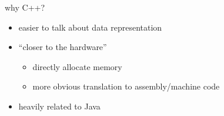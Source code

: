 \begin{frame}{why C++?}
    \begin{itemize}
    \item easier to talk about data representation
    \item ``closer to the hardware''
        \begin{itemize}
        \item directly allocate memory
        \item more obvious translation to assembly/machine code
        \end{itemize}
    \item heavily related to Java
    \end{itemize}
\end{frame}

\begin{comment}
\begin{frame}[fragile,label=cppHist]{C++ history}
\begin{tikzpicture}
\tikzset{
    histBox/.style={draw,thick,align=center,font=\fontsize{9}{10}\selectfont},
    a/.style={-Latex,thick},
    aa/.style={Latex-Latex,thick},
    b/.style={-Latex,thick,dotted},
    bb/.style={Latex-Latex,thick,dotted},
}
    \node [histBox] (bcpl) {BCPL\\(1967)};
    \node [histBox,below=.5cm of bcpl] (preC) {``K\&R'' C \\(1972-) \\ \scriptsize Dennis Ritchie, Bell Labs};
    \node [histBox,below=.5cm of preC] (cppPreStd) {C with classes/early C++ \\(1979-1997) \\ \scriptsize Bjarne Stroustrup, Bell Labs};
    \node [histBox,below left=-1cm and .5cm of preC] (isoC) {ANSI/ISO C \\ (1989) \\ \scriptsize a standards committee};
    \node [histBox,below=.5cm of cppPreStd] (isoCpp) {ISO C++ \\ (made 1989-1998) \\ (and later versions) \\ \scriptsize a standards committee};
    \draw[a] (bcpl) -- (preC);
    \draw[a] (preC) -- (isoC);
    \draw[bb] (isoC.south) -- (cppPreStd);
    \draw[a] (preC) -- (cppPreStd);
    \draw[a] (cppPreStd) -- (isoCpp);
\end{tikzpicture}
\end{frame}
\end{comment}

